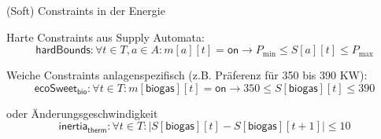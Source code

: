 \begin{frame}{(Soft) Constraints in der Energie}

\alert{Harte} Constraints aus Supply Automata:
\begin{equation}
\mathsf{hardBounds}: \forall t \in T, a \in A : m[a][t] = \mathsf{on} \rightarrow P_{\mathrm{min}} \leq S[a][t] \leq P_{\mathrm{max}} \nonumber
\end{equation}

\pause
\vspace*{2ex}
\alert{Weiche} Constraints anlagenspezifisch (z.B. Präferenz für 350 bis 390 KW):
\begin{equation}
\mathsf{ecoSweet}_{\mathsf{bio}}: \forall t \in T : m[\mathsf{biogas}][t] = \mathsf{on} \rightarrow 350 \leq S[\mathsf{biogas}][t] \leq 390 \nonumber
\end{equation}

\pause
\vspace*{2ex}
oder Änderungsgeschwindigkeit
\begin{equation}
\mathsf{inertia}_{\mathsf{therm}}: \forall t \in T : |S[\mathsf{biogas}][t] - S[\mathsf{biogas}][t+1] | \leq 10 \nonumber
\end{equation}
\end{frame}



